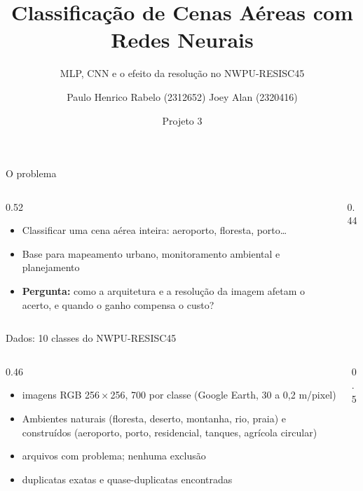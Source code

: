 \documentclass[aspectratio=169,10pt,t]{beamer}
\title{Classificação de Cenas Aéreas com Redes Neurais}
\subtitle{MLP, CNN e o efeito da resolução no NWPU-RESISC45}
\author{Paulo Henrico Rabelo (2312652) \quad Joey Alan (2320416)}
\date{Projeto 3 \textperiodcentered{} \repo}
\begin{document}
\begin{frame}[plain]
\titlepage
\end{frame}

\begin{frame}{O problema}
\begin{columns}[T]
\begin{column}{0.52\textwidth}
\begin{itemize}
\item Classificar uma cena aérea inteira: aeroporto, floresta, porto…
\item Base para mapeamento urbano, monitoramento ambiental e planejamento
\item \textbf{Pergunta:} como a arquitetura e a resolução da imagem afetam o acerto, e quando o ganho compensa o custo?
\end{itemize}
\vskip3mm
\end{column}
\begin{column}{0.44\textwidth}
\centering{}
\end{column}
\end{columns}
\end{frame}

\begin{frame}{Dados: 10 classes do NWPU-RESISC45}
\begin{columns}[T]
\begin{column}{0.46\textwidth}
\begin{itemize}
\item {} imagens RGB 256\,×\,256, 700 por classe (Google Earth, 30 a 0,2 m/pixel)
\item Ambientes naturais (floresta, deserto, montanha, rio, praia) e construídos (aeroporto, porto, residencial, tanques, agrícola circular)
\item {} arquivos com problema; nenhuma exclusão
\item {} duplicatas exatas e  quase-duplicatas encontradas
\end{itemize}
\end{column}
\begin{column}{0.5\textwidth}
\centering{}
\end{column}
\end{columns}
\end{frame}
\end{document}
